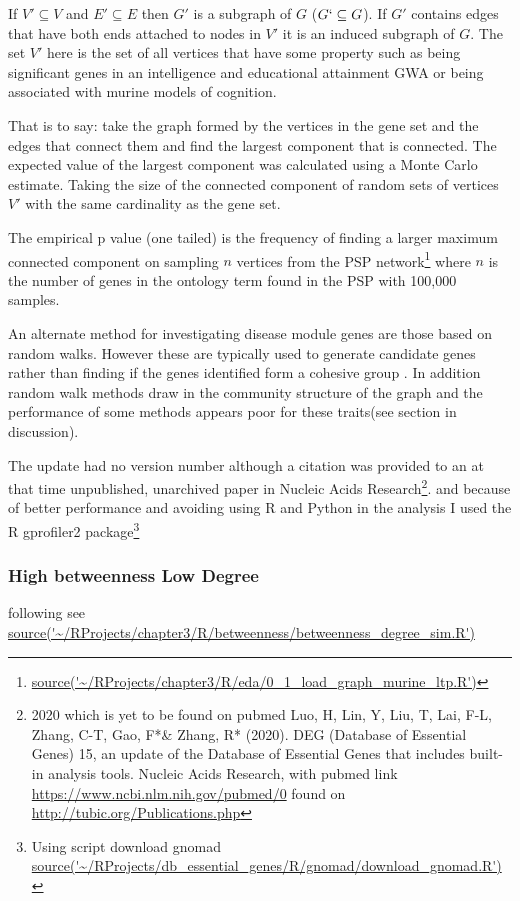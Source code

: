 If $ V' \subseteq V$ and  $E' \subseteq E$ then $G'$ is a subgraph of $G$ ($ G` \subseteq G$). If $G'$ contains edges that have both ends attached to nodes in $V'$ it is an induced subgraph of $G$\cite{diestel2017basics}. The set $V'$ here is the set of all vertices that have some property such as being significant genes in an intelligence and educational attainment GWA or being associated with murine models of cognition.

That is to say: take the graph formed by the vertices in the gene set and the edges that connect them and find the largest component that is connected. The expected value of the largest component was calculated using a Monte Carlo estimate. Taking the size of the connected component of random sets of vertices $V'$ with the same cardinality as the gene set.

The empirical p value (one tailed) is the frequency of finding a larger maximum connected component on sampling $n$ vertices from the PSP network\footnote{\url{source('~/RProjects/chapter3/R/eda/0_1_load_graph_murine_ltp.R')}} where $n$ is the number of genes in the ontology term found in the PSP with 100,000 samples.

An alternate method for investigating disease module genes are those based on random walks. However these are typically used to generate candidate genes rather than finding if the genes identified form a cohesive group . In addition random walk methods draw in the community structure of the graph and the performance of some methods appears poor for these traits(see section in discussion). 



The update had no version number although a citation was provided to an at that time unpublished, unarchived paper in Nucleic Acids Research\footnote{2020 which is yet to be found on pubmed Luo, H, Lin, Y, Liu, T, Lai, F-L, Zhang, C-T, Gao, F*\& Zhang, R* (2020). DEG (Database of Essential Genes) 15, an update of the Database of Essential Genes that includes built-in analysis tools. Nucleic Acids Research, with pubmed link \url{https://www.ncbi.nlm.nih.gov/pubmed/0} found on \url{http://tubic.org/Publications.php}}. 
 and because of better performance and avoiding using R and Python in the analysis I used the R gprofiler2 package\footnote{Using script download gnomad \url{source('~/RProjects/db_essential_genes/R/gnomad/download_gnomad.R')}}
 
 
 
 \subsubsection{High betweenness Low Degree}
following \cite{joy2005high} see \url{source('~/RProjects/chapter3/R/betweenness/betweenness_degree_sim.R')}

